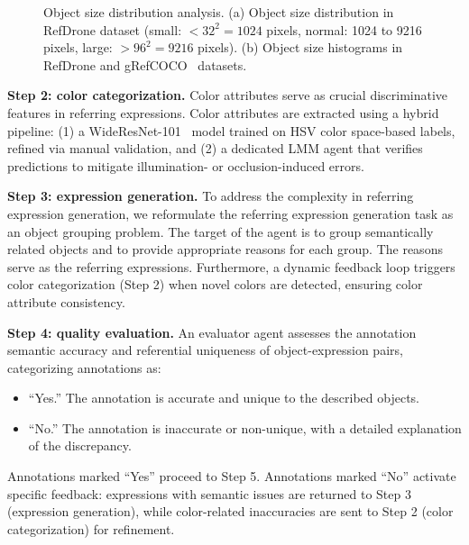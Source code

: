\begin{figure}[t]
    \caption{Object size distribution analysis. (a) Object size distribution in RefDrone dataset (small: $< 32^2 = 1024$ pixels, normal: 1024 to 9216 pixels, large: $> 96^2 = 9216$ pixels). (b) Object size histograms in RefDrone and gRefCOCO~\cite{grefcoco} datasets.}
    \label{fig:data_area}
\end{figure}


\textbf{Step 2: color categorization.} Color attributes serve as crucial discriminative features in referring expressions. Color attributes are extracted using a hybrid pipeline: (1) a WideResNet-101~\cite{wideresnet} model trained on HSV color space-based labels, refined via manual validation, and (2) a dedicated LMM agent that verifies predictions to mitigate illumination- or occlusion-induced errors.



   
\textbf{Step 3: expression generation.} To address the complexity in referring expression generation, we reformulate the referring expression generation task as an object grouping problem. The target of the agent is to group semantically related objects and to provide appropriate reasons for each group. The reasons serve as the referring expressions. Furthermore, a dynamic feedback loop triggers color categorization (Step 2) when novel colors are detected, ensuring color attribute consistency.\par

\textbf{Step 4: quality evaluation.} 
An evaluator agent assesses the annotation semantic accuracy and referential uniqueness of object-expression pairs, categorizing annotations as:
\begin{itemize} 
\item ``Yes.'' The annotation is accurate and unique to the described objects. 
\item ``No.'' The annotation is inaccurate or non-unique, with a detailed explanation of the discrepancy. 
\end{itemize} 
Annotations marked ``Yes'' proceed to Step 5. Annotations marked ``No'' activate specific feedback: expressions with semantic issues are returned to Step 3 (expression generation), while color-related inaccuracies are sent to Step 2 (color categorization) for refinement.\par


